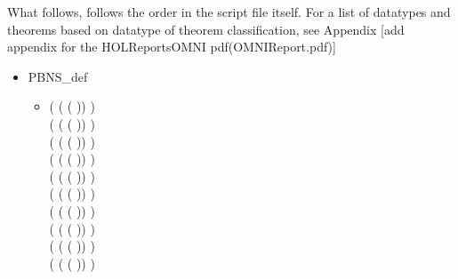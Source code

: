 What follows, follows the order in the script file itself. For a list of datatypes and
theorems based on datatype of theorem classification, see Appendix [add appendix for the HOLReportsOMNI pdf(OMNIReport.pdf)]

\begin{itemize}
\item PBNS_def
  \begin{itemize}
    \item[] \HOLTokenTurnstile{} (  ( ( )) \HOLSymConst{=} ) \HOLSymConst{\HOLTokenConj{}}\ \\
   (  ( ( )) \HOLSymConst{=} ) \HOLSymConst{\HOLTokenConj{}}\ \\
   (  ( ( )) \HOLSymConst{=} ) \HOLSymConst{\HOLTokenConj{}}\ \\
   (  ( ( )) \HOLSymConst{=} ) \HOLSymConst{\HOLTokenConj{}}\ \\
   (  ( ( )) \HOLSymConst{=} ) \HOLSymConst{\HOLTokenConj{}}\ \\
   (  ( ( )) \HOLSymConst{=} ) \HOLSymConst{\HOLTokenConj{}}\ \\
   (  ( ( )) \HOLSymConst{=} ) \HOLSymConst{\HOLTokenConj{}}\ \\
   (  ( ( )) \HOLSymConst{=} ) \HOLSymConst{\HOLTokenConj{}}\ \\
   (  ( ( )) \HOLSymConst{=} ) \HOLSymConst{\HOLTokenConj{}}\ \\
   (  ( ( )) \HOLSymConst{=} ) \HOLSymConst{\HOLTokenConj{}}\ \\

\end{itemize}
\end{itemize}
